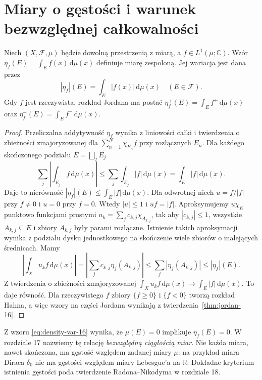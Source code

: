 \section{Miary o gęstości i warunek bezwzględnej całkowalności}
\begin{twierdzenie}
\label{thm:density-variation-16}
Niech $(X,\mathcal F,\mu)$ będzie dowolną przestrzenią
z miarą, a $f\in L^1(\mu;\mathbb C)$. Wzór
$\eta_f(E)=\int_E f(x)\,\mathrm d\mu(x)$
definiuje miarę zespoloną. Jej wariacja jest dana przez
\begin{equation}\label{eq:density-var-16}
|\eta_f|(E)=\int_E|f(x)|\,\mathrm d\mu(x)
\quad(E\in\mathcal F).
\end{equation}
Gdy $f$ jest rzeczywista, rozkład Jordana ma postać
$\eta_f^+(E)=\int_E f^+\,\mathrm d\mu(x)$ oraz
$\eta_f^-(E)=\int_E f^-\,\mathrm d\mu(x)$.
\end{twierdzenie}
\begin{proof}
Przeliczalna addytywność $\eta_f$ wynika z liniowości
całki i twierdzenia o zbieżności zmajoryzowanej dla
$\sum_{n=1}^N\chi_{E_n}f$ przy rozłącznych $E_n$.
Dla każdego skończonego podziału $E=\bigsqcup_jE_j$
\[
\sum_j\left|\int_{E_j}f\,\mathrm d\mu(x)\right|
\le\sum_j\int_{E_j}|f|\,\mathrm d\mu(x)
=\int_E|f|\,\mathrm d\mu(x).
\]
Daje to nierówność $|\eta_f|(E)\le\int_E|f|\,\mathrm d\mu(x)$.
Dla odwrotnej niech $u=\overline f/|f|$ przy $f\ne0$
i $u=0$ przy $f=0$. Wtedy $|u|\le1$ i $uf=|f|$.
Aproksymujemy $u\chi_E$ punktowo funkcjami prostymi
$u_k=\sum_jc_{k,j}\chi_{A_{k,j}}$, tak aby
$|c_{k,j}|\le1$, wszystkie $A_{k,j}\subseteq E$ i zbiory
$A_{k,j}$ były parami rozłączne.
Istnienie takich aproksymacji wynika z podziału dysku
jednostkowego na skończenie wiele zbiorów o malejących
średnicach. Mamy
\[
\left|\int_Xu_kf\,\mathrm d\mu(x)\right|
=\left|\sum_jc_{k,j}\eta_f(A_{k,j})\right|
\le\sum_j|\eta_f(A_{k,j})|\le|\eta_f|(E).
\]
Z twierdzenia o zbieżności zmajoryzowanej
$\int_Xu_kf\,\mathrm d\mu(x)\to\int_E|f|\,\mathrm d\mu(x)$.
To daje równość. Dla rzeczywistego $f$ zbiory
$\{f\ge0\}$ i $\{f<0\}$ tworzą rozkład Hahna,
a więc wzory na części Jordana wynikają z
twierdzenia~\ref{thm:jordan-16}.
\end{proof}

\begin{uwaga}
Z wzoru \eqref{eq:density-var-16} wynika, że
$\mu(E)=0$ implikuje $\eta_f(E)=0$. W rozdziale 17
nazwiemy tę relację \emph{bezwzględną ciągłością miar}.
Nie każda miara, nawet skończona, ma gęstość względem
zadanej miary $\mu$: na przykład miara Diraca $\delta_0$
nie ma gęstości względem miary Lebesgue'a na $\mathbb R$.
Dokładne kryterium istnienia gęstości poda twierdzenie
Radona--Nikodyma w rozdziale 18.
\end{uwaga}


